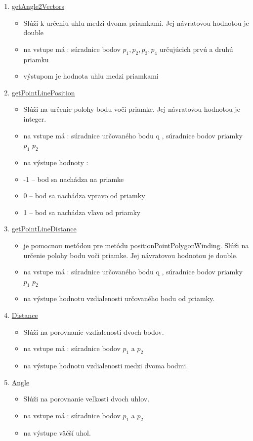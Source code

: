 \documentclass[12pt]{article}
\begin{document}
\begin{enumerate}
\item[] \underline{getAngle2Vectors}
\begin{itemize}
\item Slúži k určeniu uhlu medzi dvoma priamkami. Jej návratovou hodnotou je double
\item na vstupe má : súradnice bodov $p_1, p_2, p_3, p_4$ určujúcich prvú a druhú priamku
\item výstupom je hodnota uhlu medzi priamkami 
\end{itemize}

\item[] \underline{getPointLinePosition}
\begin{itemize}
\item Slúži na určenie polohy bodu voči priamke. Jej návratovou hodnotou je integer.
\item na vstupe má : súradnice určovaného bodu q , súradnice bodov priamky $p_1$ $p_2$
\item na výstupe hodnoty :
\item[] -1 – bod sa nachádza na priamke
\item[] 0 – bod sa nachádza vpravo od priamky
\item[] 1 – bod sa nachádza vľavo od priamky
\end{itemize}

\item[] \underline{getPointLineDistance}
\begin{itemize}
\item je pomocnou metódou pre metódu positionPointPolygonWinding. Slúži na určenie polohy bodu voči priamke. Jej návratovou hodnotou je double.
\item na vstupe má : súradnice určovaného bodu q , súradnice bodov priamky $p_1$ $p_2$
\item na výstupe hodnotu vzdialenosti určovaného bodu od priamky.
\end{itemize}

\item[] \underline{Distance}
\begin{itemize}
\item Slúži na porovnanie vzdialenosti dvoch bodov. 
\item na vstupe má : súradnice bodov  $p_1$  a $p_2$
\item na výstupe hodnotu vzdialenosti medzi dvoma bodmi.
\end{itemize}

\item[] \underline{Angle}
\begin{itemize}
\item Slúži na porovnanie veľkosti dvoch uhlov. 
\item na vstupe má : súradnice bodov $p_1$ a $p_2$
\item na výstupe väčší uhol.
\end{itemize}


\end{enumerate}
\end{document}
